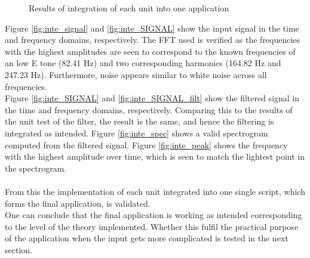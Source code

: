 \begin{figure}[H]
\begin{subfigure}{0.49\textwidth}
\end{subfigure}
\caption{Results of integration of each unit into one application }
\label{fig:inte_validation}
\end{figure}
Figure \ref{fig:inte_signal} and \ref{fig:inte_SIGNAL} show the input signal in the time and frequency domains, respectively. The FFT used is verified as the frequencies with the highest amplitudes are seen to correspond to the known frequencies of an low E tone (82.41 Hz) and two corresponding harmonics (164.82 Hz and 247.23 Hz). Furthermore, noise appears similar to white noise across all frequencies.\\
Figure \ref{fig:inte_SIGNAL} and \ref{fig:inte_SIGNAL_filt} show the filtered signal in the time and frequency domains, respectively. Comparing this to the results of the unit test of the filter, the result is the same, and hence the filtering is integrated as intended. Figure \ref{fig:inte_spec} shows a valid spectrogram computed from the filtered signal. Figure \ref{fig:inte_peak} shows the frequency with the highest amplitude over time, which is seen to match the lightest point in the spectrogram. \\
\\
From this the implementation of each unit integrated into one single script, which forms the final application, is validated. \\
One can conclude that the final application is working as intended corresponding to the level of the theory implemented. Whether this fulfil the practical purpose of the application when the input gets more complicated is tested in the next section.